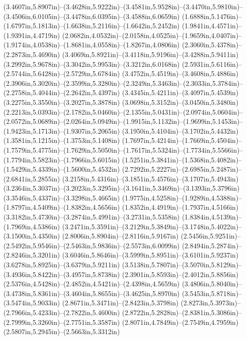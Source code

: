 (3.4607in,5.8907in)--(3.4628in,5.9222in)--(3.4581in,5.9528in)--(3.4470in,5.9810in)--(3.4506in,6.0105in)--(3.4478in,6.0395in)--(3.4588in,6.0659in) (1.6888in,5.1476in)--(1.6797in,5.1813in)--(1.6638in,5.2116in)--(1.6642in,5.2452in) (1.9841in,4.4571in)--(1.9391in,4.4719in) (2.0682in,4.0532in)--(2.0158in,4.0525in)--(1.9659in,4.0407in)--(1.9174in,4.0538in)--(1.8681in,4.0558in)--(1.8267in,4.0806in) (2.3060in,5.4378in)--(2.2873in,5.4690in) (3.4069in,5.8921in)--(3.4118in,5.9196in)--(3.4288in,5.9411in) (3.2992in,5.9678in)--(3.3042in,5.9953in)--(3.3212in,6.0168in) (2.5931in,5.6116in)--(2.5744in,5.6428in)--(2.5729in,5.6784in) (3.4752in,5.4519in)--(3.4608in,5.4886in) (2.3906in,5.3020in)--(2.3599in,5.3280in)--(2.3249in,5.3463in)--(2.3033in,5.3784in)--(2.2758in,5.4044in)--(2.2642in,5.4397in) (3.4345in,5.4211in)--(3.4097in,5.4539in) (3.2275in,5.3550in)--(3.2027in,5.3878in) (3.0698in,5.3152in)--(3.0450in,5.3480in) (2.2213in,5.0393in)--(2.1782in,5.0460in)--(2.1355in,5.0431in)--(2.0974in,5.0604in)--(2.0572in,5.0689in)--(2.0264in,5.0949in)--(1.9915in,5.1132in)--(1.9699in,5.1453in)--(1.9423in,5.1713in)--(1.9307in,5.2065in) (3.1950in,5.4104in)--(3.1702in,5.4432in) (1.3581in,5.1215in)--(1.3753in,5.1408in) (1.7697in,5.4214in)--(1.7669in,5.4504in)--(1.7579in,5.4775in)--(1.7629in,5.5050in)--(1.7617in,5.5324in)--(1.7734in,5.5566in)--(1.7794in,5.5823in)--(1.7966in,5.6015in) (1.5251in,5.3841in)--(1.5368in,5.4082in)--(1.5429in,5.4339in)--(1.5600in,5.4532in) (2.7292in,5.2227in)--(2.6985in,5.2487in)--(2.6841in,5.2855in) (3.2158in,5.4316in)--(3.1851in,5.4576in)--(3.1707in,5.4943in) (3.2364in,5.3037in)--(3.2023in,5.3295in)--(3.1641in,5.3469in)--(3.1393in,5.3796in) (3.3546in,5.4337in)--(3.3298in,5.4665in) (1.9775in,4.5258in)--(1.9289in,4.5388in)--(1.8797in,4.5409in)--(1.8382in,4.5656in) (1.8352in,4.4919in)--(1.7937in,4.5166in) (3.3182in,5.4730in)--(3.2874in,5.4991in)--(3.2731in,5.5358in) (1.8384in,4.5139in)--(1.7969in,4.5386in) (3.2471in,5.3591in)--(3.2129in,5.3849in)--(3.1748in,5.4022in)--(3.1500in,5.4350in) (2.8006in,5.8904in)--(2.8116in,5.9167in) (2.5456in,5.9251in)--(2.5492in,5.9546in)--(2.5463in,5.9836in)--(2.5573in,6.0099in) (2.8494in,5.2874in)--(2.8246in,5.3201in) (3.6046in,5.8646in)--(3.5999in,5.8951in)--(3.6101in,5.9237in) (3.6278in,5.8925in)--(3.6379in,5.9211in) (3.5138in,5.7807in)--(3.5070in,5.8129in)--(3.4936in,5.8422in)--(3.4957in,5.8738in) (2.3901in,5.8593in)--(2.4012in,5.8856in) (2.5376in,4.5428in)--(2.4852in,4.5421in)--(2.4398in,4.5659in) (3.4806in,5.8040in)--(3.4738in,5.8361in)--(3.4604in,5.8655in)--(3.4625in,5.8970in) (3.5453in,5.8718in)--(3.5474in,5.9033in) (2.8671in,5.3471in)--(2.8423in,5.3798in) (2.8273in,5.3973in)--(2.7966in,5.4233in)--(2.7822in,5.4600in) (2.8722in,5.2828in)--(2.8381in,5.3086in)--(2.7999in,5.3260in)--(2.7751in,5.3587in) (2.8071in,4.7849in)--(2.7549in,4.7959in) (2.5807in,5.2945in)--(2.5663in,5.3312in) 
